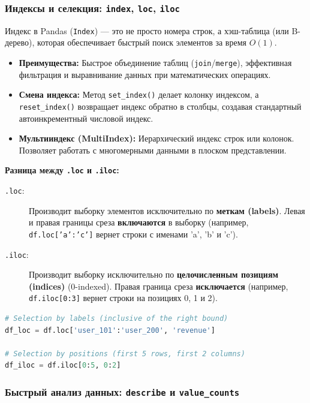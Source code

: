 \documentclass[12pt]{article}
\begin{document}
\subsubsection{Индексы и селекция: \texttt{index}, \texttt{loc}, \texttt{iloc}}

Индекс в Pandas (\texttt{Index}) --- это не просто номера строк, а хэш-таблица (или B-дерево), которая обеспечивает быстрый поиск элементов за время $O(1)$. 
\begin{itemize}
    \item \textbf{Преимущества:} Быстрое объединение таблиц (\texttt{join}/\texttt{merge}), эффективная фильтрация и выравнивание данных при математических операциях.
    \item \textbf{Смена индекса:} Метод \texttt{set\_index()} делает колонку индексом, а \texttt{reset\_index()} возвращает индекс обратно в столбцы, создавая стандартный автоинкрементный числовой индекс.
    \item \textbf{Мультииндекс (MultiIndex):} Иерархический индекс строк или колонок. Позволяет работать с многомерными данными в плоском представлении.
\end{itemize}

\textbf{Разница между \texttt{.loc} и \texttt{.iloc}:}
\begin{description}
    \item[\texttt{.loc}:] Производит выборку элементов исключительно по \textbf{меткам (labels)}. Левая и правая границы среза \textbf{включаются} в выборку (например, \texttt{df.loc['a':'c']} вернет строки с именами 'a', 'b' и 'c').
    \item[\texttt{.iloc}:] Производит выборку исключительно по \textbf{целочисленным позициям (indices)} (0-indexed). Правая граница среза \textbf{исключается} (например, \texttt{df.iloc[0:3]} вернет строки на позициях 0, 1 и 2).
\end{description}

\begin{lstlisting}[language=Python, caption={Пример работы с индексами и срезами}]
# Selection by labels (inclusive of the right bound)
df_loc = df.loc['user_101':'user_200', 'revenue']

# Selection by positions (first 5 rows, first 2 columns)
df_iloc = df.iloc[0:5, 0:2]
\end{lstlisting}

\subsubsection{Быстрый анализ данных: \texttt{describe} и \texttt{value\_counts}}
\end{document}
